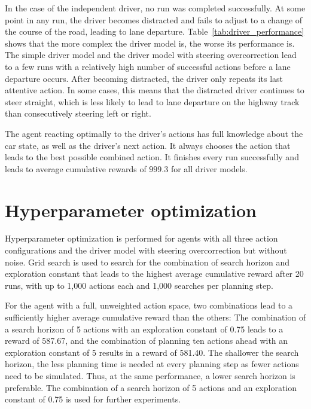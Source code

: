 In the case of the independent driver, no run was completed successfully. At some point in any run, the driver becomes distracted and fails to adjust to a change of the course of the road, leading to lane departure. Table~\ref{tab:driver_performance} shows that the more complex the driver model is, the worse its performance is. The simple driver model and the driver model with steering overcorrection lead to a few runs with a relatively high number of successful actions before a lane departure occurs. After becoming distracted, the driver only repeats its last attentive action. In some cases, this means that the distracted driver continues to steer straight, which is less likely to lead to lane departure on the highway track than consecutively steering left or right.

The agent reacting optimally to the driver's actions has full knowledge about the car state, as well as the driver's next action. It always chooses the action that leads to the best possible combined action. It finishes every run successfully and leads to average cumulative rewards of $999.3$ for all driver models.



\section{Hyperparameter optimization}
\label{sec:grid_search}

Hyperparameter optimization is performed for agents with all three action configurations and the driver model with steering overcorrection but without noise. Grid search is used to search for the combination of search horizon and exploration constant that leads to the highest average cumulative reward after 20 runs, with up to 1,000 actions each and 1,000 searches per planning step.



For the agent with a full, unweighted action space, two combinations lead to a sufficiently higher average cumulative reward than the others: The combination of a search horizon of 5 actions with an exploration constant of 0.75 leads to a reward of 587.67, and the combination of planning ten actions ahead with an exploration constant of 5 results in a reward of 581.40. The shallower the search horizon, the less planning time is needed at every planning step as fewer actions need to be simulated. Thus, at the same performance, a lower search horizon is preferable. The combination of a search horizon of 5 actions and an exploration constant of 0.75 is used for further experiments.


